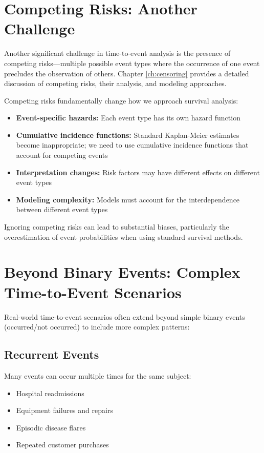 \section{Competing Risks: Another Challenge}

Another significant challenge in time-to-event analysis is the presence of competing risks—multiple possible event types where the occurrence of one event precludes the observation of others. Chapter \ref{ch:censoring} provides a detailed discussion of competing risks, their analysis, and modeling approaches.

Competing risks fundamentally change how we approach survival analysis:

\begin{itemize}
\item \textbf{Event-specific hazards:} Each event type has its own hazard function
\item \textbf{Cumulative incidence functions:} Standard Kaplan-Meier estimates become inappropriate; we need to use cumulative incidence functions that account for competing events
\item \textbf{Interpretation changes:} Risk factors may have different effects on different event types
\item \textbf{Modeling complexity:} Models must account for the interdependence between different event types
\end{itemize}

Ignoring competing risks can lead to substantial biases, particularly the overestimation of event probabilities when using standard survival methods.

\section{Beyond Binary Events: Complex Time-to-Event Scenarios}

Real-world time-to-event scenarios often extend beyond simple binary events (occurred/not occurred) to include more complex patterns:

\subsection{Recurrent Events}

Many events can occur multiple times for the same subject:

\begin{itemize}
\item Hospital readmissions
\item Equipment failures and repairs
\item Episodic disease flares
\item Repeated customer purchases
\end{itemize}

